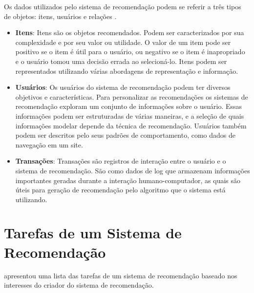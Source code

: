 Os dados utilizados pelo sistema de recomendação podem se referir a três tipos de objetos: itens, usuários e relações \citep{ricci2011recommender}.

\begin{itemize}
	\item{\textbf{Itens}: Itens são os objetos recomendados. Podem ser caracterizados por sua complexidade e por seu valor ou utilidade. O valor de um item pode ser positivo se o item é útil para o usuário, ou negativo se o item é inapropriado e o usuário tomou uma decisão errada ao selecioná-lo. Itens podem ser representados utilizando várias abordagens de representação e informação.}
	
	\item{\textbf{Usuários}: Os usuários do sistema de recomendação podem ter diversos objetivos e características. Para personalizar as recomendações os sistemas de recomendação exploram um conjunto de informações sobre o usuário. Essas informações podem ser estruturadas de várias maneiras, e a seleção de quais informações modelar depende da técnica de recomendação. Usuários também podem ser descritos pelo seus padrões de comportamento, como dados de navegação em um site.}
	
	\item{\textbf{Transações}: Transações são registros de interação entre o usuário e o sistema de recomendação. São como dados de log que armazenam informações importantes geradas durante a interação humano-computador, as quais são úteis para geração de recomendação pelo algoritmo que o sistema está utilizando.}
\end{itemize}

\section{Tarefas de um Sistema de Recomendação}
\label{sec:tarefasSistemaRecomendacao}

\cite{ricci2011recommender} apresentou uma lista das tarefas de um sistema de recomendação baseado nos interesses do criador do sistema de recomendação.

